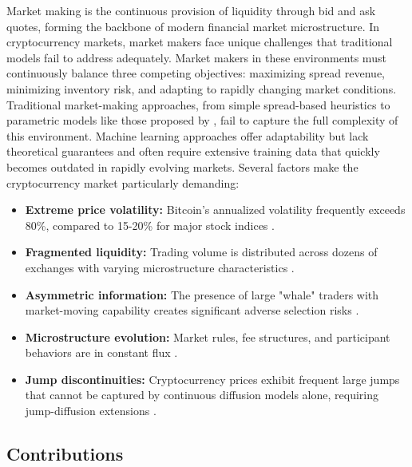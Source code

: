 \documentclass[twocolumn,11pt]{IEEEtran}  %
\begin{document}
Market making is the continuous provision of liquidity through bid and ask quotes, forming the backbone of modern financial market microstructure. In cryptocurrency markets, market makers face unique challenges that traditional models fail to address adequately. Market makers in these environments must continuously balance three competing objectives: maximizing spread revenue, minimizing inventory risk, and adapting to rapidly changing market conditions. Traditional market-making approaches, from simple spread-based heuristics to parametric models like those proposed by \cite{avellaneda2008}, fail to capture the full complexity of this environment. Machine learning approaches \cite{spooner2018market} offer adaptability but lack theoretical guarantees and often require extensive training data that quickly becomes outdated in rapidly evolving markets. Several factors make the cryptocurrency market particularly demanding:

\begin{itemize}
    \item \textbf{Extreme price volatility:} Bitcoin's annualized volatility frequently exceeds 80\%, compared to 15-20\% for major stock indices \cite{baur2018bitcoin}.
    
    \item \textbf{Fragmented liquidity:} Trading volume is distributed across dozens of exchanges with varying microstructure characteristics \cite{makarov2020trading}.
    
    \item \textbf{Asymmetric information:} The presence of large "whale" traders with market-moving capability creates significant adverse selection risks \cite{cong2021crypto}.
    
    \item \textbf{Microstructure evolution:} Market rules, fee structures, and participant behaviors are in constant flux \cite{hautsch2019limits}.
    
    \item \textbf{Jump discontinuities:} Cryptocurrency prices exhibit frequent large jumps that cannot be captured by continuous diffusion models alone, requiring jump-diffusion extensions \cite{merton1976option}.
\end{itemize}

\subsection{Contributions}
\end{document}
